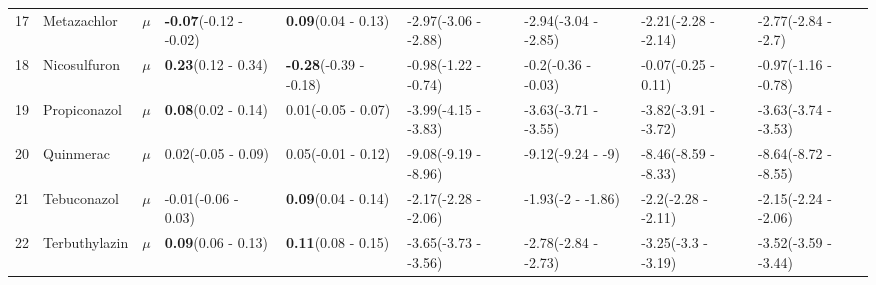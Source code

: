 \begin{landscape}
\begin{longtable}{lp{2cm}p{0.6cm}p{1.8cm}p{1.8cm}p{1.8cm}p{1.8cm}p{1.8cm}p{1.8cm}}
  17 & Metazachlor & $\mu$ & \textbf{-0.07}\newline (-0.12 - -0.02) & \textbf{0.09}\newline (0.04 - 0.13) & -2.97\newline (-3.06 - -2.88) & -2.94\newline (-3.04 - -2.85) & -2.21\newline (-2.28 - -2.14) & -2.77\newline (-2.84 - -2.7) \\ 
  18 & Nicosulfuron & $\mu$ & \textbf{0.23}\newline (0.12 - 0.34) & \textbf{-0.28}\newline (-0.39 - -0.18) & -0.98\newline (-1.22 - -0.74) & -0.2\newline (-0.36 - -0.03) & -0.07\newline (-0.25 - 0.11) & -0.97\newline (-1.16 - -0.78) \\ 
  19 & Propiconazol & $\mu$ & \textbf{0.08}\newline (0.02 - 0.14) & 0.01\newline (-0.05 - 0.07) & -3.99\newline (-4.15 - -3.83) & -3.63\newline (-3.71 - -3.55) & -3.82\newline (-3.91 - -3.72) & -3.63\newline (-3.74 - -3.53) \\ 
  20 & Quinmerac & $\mu$ & 0.02\newline (-0.05 - 0.09) & 0.05\newline (-0.01 - 0.12) & -9.08\newline (-9.19 - -8.96) & -9.12\newline (-9.24 - -9) & -8.46\newline (-8.59 - -8.33) & -8.64\newline (-8.72 - -8.55) \\ 
  21 & Tebuconazol & $\mu$ & -0.01\newline (-0.06 - 0.03) & \textbf{0.09}\newline (0.04 - 0.14) & -2.17\newline (-2.28 - -2.06) & -1.93\newline (-2 - -1.86) & -2.2\newline (-2.28 - -2.11) & -2.15\newline (-2.24 - -2.06) \\ 
  22 & Terbuthylazin & $\mu$ & \textbf{0.09}\newline (0.06 - 0.13) & \textbf{0.11}\newline (0.08 - 0.15) & -3.65\newline (-3.73 - -3.56) & -2.78\newline (-2.84 - -2.73) & -3.25\newline (-3.3 - -3.19) & -3.52\newline (-3.59 - -3.44) \\ 

\end{longtable}
\end{landscape}
